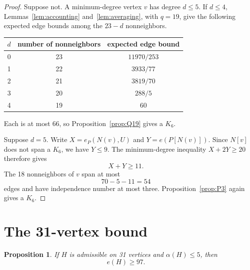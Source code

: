 \documentclass[11pt,reqno,a4paper]{amsart}
\newtheorem{proposition}[theorem]{Proposition}
\theoremstyle{definition}
\theoremstyle{remark}
\begin{document}
\begin{proof}
Suppose not.  A minimum-degree vertex $v$ has degree $d\leq5$.  If
$d\leq4$, Lemmas~\ref{lem:accounting} and~\ref{lem:averaging}, with
$q=19$, give the following expected edge bounds among the $23-d$
nonneighbors.
\begin{center}
\begin{tabular}{c@{\qquad}c@{\qquad}c}
\toprule
$d$ & number of nonneighbors & expected edge bound\\
\midrule
0 & 23 & $11970/253$\\
1 & 22 & $3933/77$\\
2 & 21 & $3819/70$\\
3 & 20 & $288/5$\\
4 & 19 & $60$\\
\bottomrule
\end{tabular}
\end{center}
Each is at most 66, so Proposition~\ref{prop:Q19} gives a $K_6$.

Suppose $d=5$.  Write $X=e_P(N(v),U)$ and $Y=e(P[N(v)])$.  Since $N[v]$
does not span a $K_6$, we have $Y\leq9$.  The minimum-degree inequality
$X+2Y\geq20$ therefore gives
\[
  X+Y\geq11.
\]
The 18 nonneighbors of $v$ span at most
\[
  70-5-11=54
\]
edges and have independence number at most three.  Proposition~\ref{prop:P3}
again gives a $K_6$.
\end{proof}

\section{The 31-vertex bound}

\begin{proposition}\label{prop:T31}
If $H$ is admissible on 31 vertices and $\alpha(H)\leq5$, then
\[
  e(H)\geq97.
\]
\end{proposition}
\end{document}
